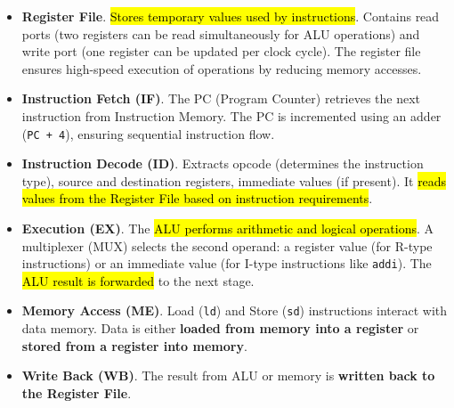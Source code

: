 \begin{itemize}
    \item \textbf{Register File}. \hl{Stores temporary values used by instructions}. Contains read ports (two registers can be read simultaneously for ALU operations) and write port (one register can be updated per clock cycle). The register file ensures high-speed execution of operations by reducing memory accesses.
    \item \textbf{Instruction Fetch (IF)}. The PC (Program Counter) retrieves the next instruction from Instruction Memory. The PC is incremented using an adder (\texttt{PC + 4}), ensuring sequential instruction flow.
    \item \textbf{Instruction Decode (ID)}. Extracts opcode (determines the instruction type), source and destination registers, immediate values (if present). It \hl{reads values from the Register File based on instruction requirements}.
    \item \textbf{Execution (EX)}. The \hl{ALU performs arithmetic and logical operations}. A multiplexer (MUX) selects the second operand: a register value (for R-type instructions) or an immediate value (for I-type instructions like \texttt{addi}). The \hl{ALU result is forwarded} to the next stage.
    \item \textbf{Memory Access (ME)}. Load (\texttt{ld}) and Store (\texttt{sd}) instructions interact with data memory. Data is either \textbf{loaded from memory into a register} or \textbf{stored from a register into memory}.
    \item \textbf{Write Back (WB)}. The result from ALU or memory is \textbf{written back to the Register File}.
\end{itemize}

\newpage

